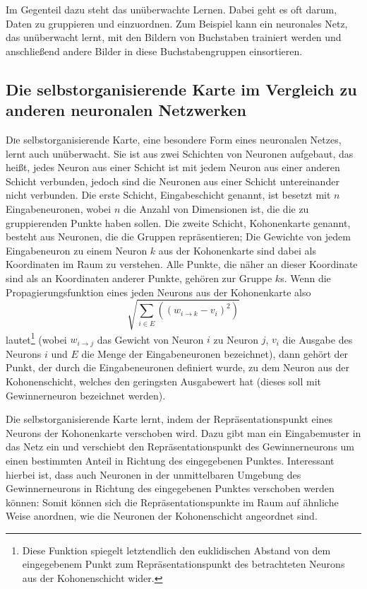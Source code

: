 \documentclass[twoside,a4paper]{article}
\newcommand{\commonlettrine}[1]{\lettrine[nindent=0em,lines=2]{#1}}
\begin{document}
Im Gegenteil dazu steht das unüberwachte Lernen. Dabei geht es oft darum, Daten zu gruppieren und einzuordnen. Zum Beispiel kann ein neuronales Netz, das unüberwacht lernt, mit den Bildern von Buchstaben trainiert werden und anschließend andere Bilder in diese Buchstabengruppen einsortieren.

\subsection{Die selbstorganisierende Karte im Vergleich zu anderen neuronalen Netzwerken}

\commonlettrine{D}ie selbstorganisierende Karte, eine besondere Form eines neuronalen Netzes, lernt auch unüberwacht. Sie ist aus zwei Schichten von Neuronen aufgebaut, das heißt, jedes Neuron aus einer Schicht ist mit jedem Neuron aus einer anderen Schicht verbunden, jedoch sind die Neuronen aus einer Schicht untereinander nicht verbunden. Die erste Schicht, Eingabeschicht genannt, ist besetzt mit \(n\) Eingabeneuronen, wobei \(n\) die Anzahl von Dimensionen ist, die die zu gruppierenden Punkte haben sollen. Die zweite Schicht, Kohonenkarte genannt, besteht aus Neuronen, die die Gruppen repräsentieren; Die Gewichte von jedem Eingabeneuron zu einem Neuron \(k\) aus der Kohonenkarte sind dabei als Koordinaten im Raum zu verstehen. Alle Punkte, die näher an dieser Koordinate sind als an Koordinaten anderer Punkte, gehören zur Gruppe \(k\)s. Wenn die Propagierungsfunktion eines jeden Neurons aus der Kohonenkarte also
\[
\sqrt{\sum_{i\in{}E} \left((w_{i\rightarrow{}k} - v_i)^2\right)}
\]
lautet\footnote{Diese Funktion spiegelt letztendlich den euklidischen Abstand von dem eingegebenem Punkt zum Repräsentationspunkt des betrachteten Neurons aus der Kohonenschicht wider.} (wobei \(w_{i\rightarrow{}j}\) das Gewicht von Neuron \(i\) zu Neuron \(j\), \(v_i\) die Ausgabe des Neurons \(i\) und \(E\) die Menge der Eingabeneuronen bezeichnet), dann gehört der Punkt, der durch die Eingabeneuronen definiert wurde, zu dem Neuron aus der Kohonenschicht, welches den geringsten Ausgabewert hat (dieses soll mit \glqq{}Gewinnerneuron\grqq{} bezeichnet werden).

Die selbstorganisierende Karte lernt, indem der Repräsentationspunkt eines Neurons der Kohonenkarte verschoben wird. Dazu gibt man ein Eingabemuster in das Netz ein und verschiebt den Repräsentationspunkt des Gewinnerneurons um einen bestimmten Anteil in Richtung des eingegebenen Punktes. Interessant hierbei ist, dass auch Neuronen in der unmittelbaren Umgebung des Gewinnerneurons in Richtung des eingegebenen Punktes verschoben werden können: Somit können sich die Repräsentationspunkte im Raum auf ähnliche Weise anordnen, wie die Neuronen der Kohonenschicht angeordnet sind.
\end{document}
